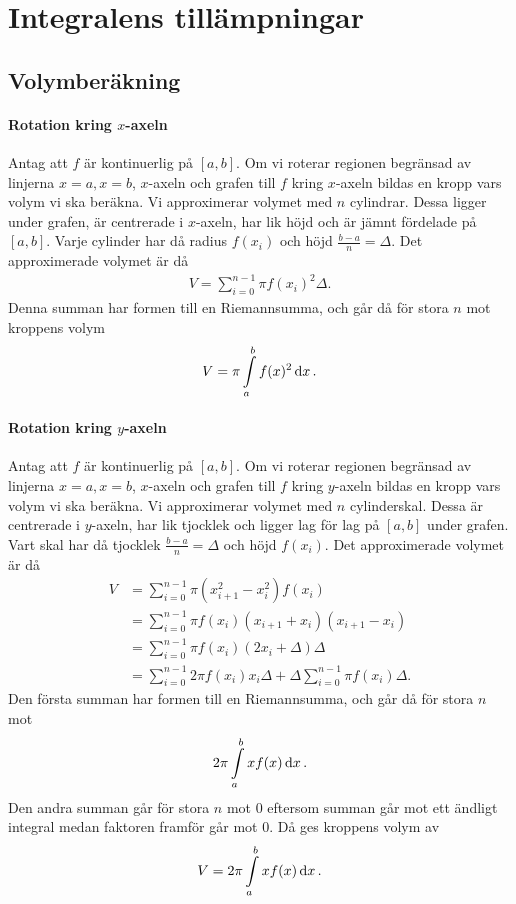 \section{Integralens tillämpningar}

\subsection{Volymberäkning}

\paragraph{Rotation kring $x$-axeln}
Antag att $f$ är kontinuerlig på $[a, b]$. Om vi roterar regionen begränsad av linjerna $x = a, x = b$, $x$-axeln och grafen till $f$ kring $x$-axeln bildas en kropp vars volym vi ska beräkna. Vi approximerar volymet med $n$ cylindrar. Dessa ligger under grafen, är centrerade i $x$-axeln, har lik höjd och är jämnt fördelade på $[a, b]$. Varje cylinder har då radius $f(x_i)$ och höjd $\frac{b - a}{n} = \Delta$. Det approximerade volymet är då
\begin{align*}
	V = \sum\limits_{i = 0}^{n - 1}\pi f(x_i)^2\Delta.
\end{align*}
Denna summan har formen till en Riemannsumma, och går då för stora $n$ mot kroppens volym
\begin{align*}
	V = \pi\int\limits_{a}^{b}f(x)^2\dd{x}.
\end{align*}

\paragraph{Rotation kring $y$-axeln}
Antag att $f$ är kontinuerlig på $[a, b]$. Om vi roterar regionen begränsad av linjerna $x = a, x = b$, $x$-axeln och grafen till $f$ kring $y$-axeln bildas en kropp vars volym vi ska beräkna. Vi approximerar volymet med $n$ cylinderskal. Dessa är centrerade i $y$-axeln, har lik tjocklek och ligger lag för lag på $[a, b]$ under grafen. Vart skal har då tjocklek $\frac{b - a}{n} = \Delta$ och höjd $f(x_i)$. Det approximerade volymet är då
\begin{align*}
	V &= \sum\limits_{i = 0}^{n - 1}\pi(x_{i + 1}^2 - x_i^2)f(x_i)\\
	  &= \sum\limits_{i = 0}^{n - 1}\pi f(x_i)(x_{i + 1} + x_i)(x_{i + 1} - x_i) \\
	  &= \sum\limits_{i = 0}^{n - 1}\pi f(x_i)(2x_i + \Delta)\Delta \\
	  &= \sum\limits_{i = 0}^{n - 1}2\pi f(x_i)x_i\Delta + \Delta\sum\limits_{i = 0}^{n - 1}\pi f(x_i)\Delta.
\end{align*}
Den första summan har formen till en Riemannsumma, och går då för stora $n$ mot
\begin{align*}
	2\pi\int\limits_{a}^{b}xf(x)\dd{x}.
\end{align*}
Den andra summan går för stora $n$ mot $0$ eftersom summan går mot ett ändligt integral medan faktoren framför går mot $0$. Då ges kroppens volym av
\begin{align*}
	V = 2\pi\int\limits_{a}^{b}xf(x)\dd{x}.
\end{align*}